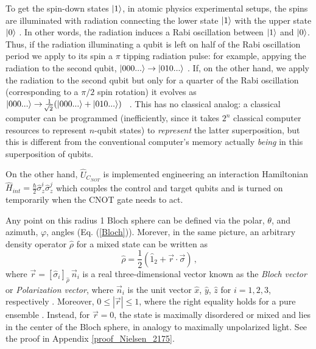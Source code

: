 \documentclass[11pt]{article}
\numberwithin{equation}{section} %
\numberwithin{figure}{section} %
\begin{document}
\begin{appendices}
To get the spin-down states $\ket{1}$, in atomic physics experimental setups, the spins are illuminated with radiation connecting the lower state $\ket{1}$ with the upper state $\ket{0}$ \cite[p.~4602, l.~43-52]{DiVincenzo}. In other words, the radiation induces a Rabi oscillation between $\ket{1}$ and $\ket{0}$. Thus, if the radiation illuminating a qubit is left on half of the Rabi oscillation period we apply to its spin a $\pi$ tipping radiation pulse: for example, appying the radiation to the second qubit, $\ket{000...}\rightarrow\ket{010...}$ . If, on the other hand, we apply the radiation to the second qubit but only for a quarter of the Rabi oscillation (corresponding to a $\pi/2$ spin rotation) it evolves as $\ket{000...}\rightarrow\frac{1}{\sqrt[]{2}}(\ket{000...}+\ket{010...})$ $\,$ \cite[p.~4603, Eq.~(2)]{DiVincenzo}. This has no classical analog: a classical computer can be programmed (inefficiently, since it takes $2^n$ classical computer resources to represent $n$-qubit states) to \emph{represent} the latter superposition, but this is different from the conventional computer's memory actually \emph{being} in this superposition of qubits.

On the other hand, $\hat{U}_{C_{NOT}}$ is implemented engineering an interaction Hamiltonian $\hat{H}_{int}=\frac{\hbar}{2}\hat{\sigma}_z^i\hat{\sigma}_z^j$ which couples the control and target qubits and is turned on temporarily when the CNOT gate needs to act.

Any point on this radius 1 Bloch sphere can be defined via the polar, $\theta$, and azimuth, $\varphi$, angles (Eq. (\ref{Bloch})). Morever, in the same picture, an arbitrary density operator $\hat{\rho}$ for a mixed state can be written as
\begin{equation} \label{Nielsen_2175}
 \hat{\rho}=\frac{1}{2}(\hat{1}_2+\vec{r}\cdot\vec{\sigma})\,\textrm{,}
\end{equation}
where $\vec{r}=[\hat{\sigma}_i]_{\hat{\rho}}\,\vec{n}_i$ is a real three-dimensional vector known as the \emph{Bloch vector} or \emph{Polarization vector}, where $\vec{n}_i$ is the unit vector $\hat{x}$, $\hat{y}$, $\hat{z}$ for $i=1,2,3$, respectively \cite[p.~4, l.~31-32]{Ferraro}. Moreover, $0\leq|\vec{r}|\leq 1$, where the right equality holds for a pure ensemble \cite[p.~195, Eq.~(2.175)]{Nielsen}. Instead, for $\vec{r}=0$, the state is maximally disordered or mixed and lies in the center of the Bloch sphere, in analogy to maximally unpolarized light. See the proof in Appendix \ref{proof_Nielsen_2175}.\\


\end{appendices}
\end{document}
